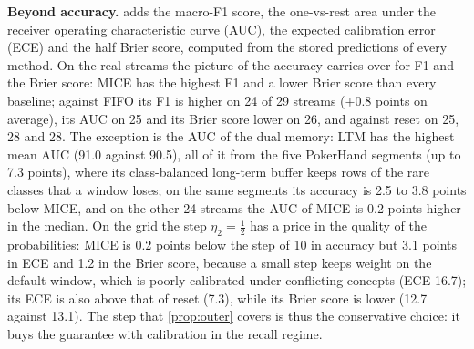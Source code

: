 \documentclass[11pt]{article}
\theoremstyle{plain}
\theoremstyle{definition}
\theoremstyle{remark}
\newcommand{\method}{\textsc{MICE}}   %
\begin{document}
\textbf{Beyond accuracy.}  adds the macro-F1 score, the one-vs-rest area under the receiver operating characteristic curve (AUC), the expected
calibration error (ECE) and the half Brier score, computed from the stored predictions of every method. On the real
streams the picture of the accuracy carries over for F1 and the Brier score: \method{} has the highest F1 and a lower
Brier score than every baseline; against FIFO its F1 is higher on 24 of 29 streams ($+0.8$ points on average), its
AUC on 25 and its Brier score lower on 26, and against reset on 25, 28 and 28. The exception is the AUC of the dual
memory: LTM has the highest mean AUC (91.0 against 90.5), all of it from the five PokerHand segments (up to 7.3
points), where its class-balanced long-term buffer keeps rows of the rare classes that a window loses; on the
same segments its accuracy is 2.5 to 3.8 points below \method{}, and on the other 24 streams the AUC of \method{}
is 0.2 points higher in the median. On the grid the step $\eta_2=\tfrac12$ has a price in the quality of the probabilities:
\method{} is 0.2 points below the step of 10 in accuracy but 3.1 points in ECE and 1.2 in the Brier score, because a
small step keeps weight on the default window, which is poorly calibrated under conflicting concepts (ECE 16.7);
its ECE is also above that of reset (7.3), while its Brier score is lower (12.7 against 13.1).
The step that \cref{prop:outer} covers is thus the conservative choice: it buys the guarantee with calibration in the
recall regime.

\begin{table}[!t]
  \centering
  \caption{Metrics beyond accuracy (\%, mean over streams): macro-F1, one-vs-rest ROC AUC, expected calibration error
  (15 bins) and half Brier score, on the 29 real streams and the 24 grid streams. Computed from stored predictions;
  the best value per column is in bold.}
  \label{tab:metrics}
  \small
  \setlength{\tabcolsep}{5pt}
\end{table}
\end{document}
